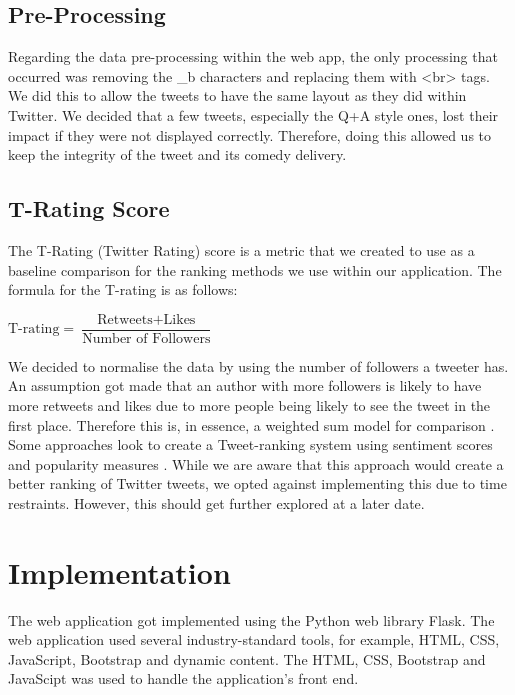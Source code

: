 	\subsection{Pre-Processing}
		Regarding the data pre-processing within the web app, the only processing that occurred was removing the \_b characters and replacing them with <br> tags. We did this to allow the tweets to have the same layout as they did within Twitter. We decided that a few tweets, especially the Q+A style ones, lost their impact if they were not displayed correctly. Therefore, doing this allowed us to keep the integrity of the tweet and its comedy delivery.
	
	\subsection{T-Rating Score}
		The T-Rating (Twitter Rating) score is a metric that we created to use as a baseline comparison for the ranking methods we use within our application. The formula for the T-rating is as follows: %
		
		\begin{center}
			$ \text{T-rating} = \dfrac{\text{Retweets} + \text{Likes}}{\text{Number of Followers}}$
		\end{center}
		
		We decided to normalise the data by using the number of followers a tweeter has. An assumption got made that an author with more followers is likely to have more retweets and likes due to more people being likely to see the tweet in the first place. Therefore this is, in essence, a weighted sum model for comparison \cite{churchman1954approximate}. Some approaches look to create a Tweet-ranking system using sentiment scores and popularity measures \cite{aleidi2019tweet}. While we are aware that this approach would create a better ranking of Twitter tweets, we opted against implementing this due to time restraints. However, this should get further explored at a later date.
	
	\section{Implementation}
	
	The web application got implemented using the Python web library Flask. The web application used several industry-standard tools, for example, HTML, CSS, JavaScript, Bootstrap and dynamic content. The HTML, CSS, Bootstrap and JavaScipt was used to handle the application's front end. 
	
